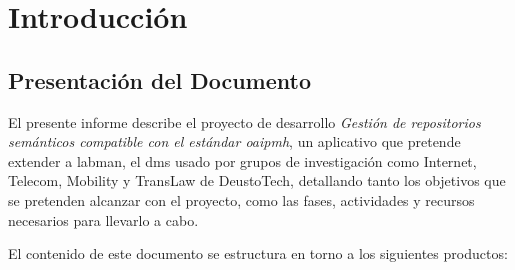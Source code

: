 \chapter{Introducción}\label{cha:introduccion}

\section{Presentación del Documento}

El presente informe describe el proyecto de desarrollo \emph{Gestión de repositorios semánticos compatible con el estándar \acrfull{oaipmh}}, un aplicativo que pretende extender a \acrfull{labman}, el \acrshort{dms} usado por grupos de investigación como Internet, Telecom, Mobility y TransLaw de DeustoTech, detallando tanto los objetivos que se pretenden alcanzar con el proyecto, como las fases, actividades y recursos necesarios para llevarlo a cabo.

El contenido de este documento se estructura en torno a los siguientes productos:

